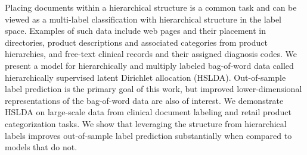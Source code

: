 Placing documents within a hierarchical structure is a common task and can be viewed as a multi-label classification with hierarchical structure in the label space.  Examples of such data include web pages and their placement in directories, product
descriptions and associated categories from product hierarchies, and free-text
clinical records and their assigned diagnosis codes. We present a
model for hierarchically and multiply labeled bag-of-word data called hierarchically supervised latent Dirichlet allocation (HSLDA).  Out-of-sample label
prediction is the primary goal of this work, but improved lower-dimensional
representations of the bag-of-word data are also of interest.
We demonstrate HSLDA on large-scale data from clinical document labeling and
retail product categorization tasks. We show that leveraging the structure from
hierarchical labels improves out-of-sample label prediction substantially when
compared to models that do not. %


